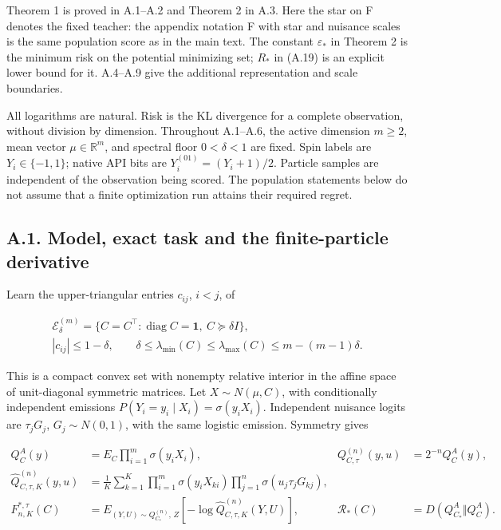 \documentclass{article}
\begin{document}
Theorem 1 is proved in A.1--A.2 and Theorem 2 in A.3. Here the star on F
denotes the fixed teacher: the appendix notation F with star and
nuisance scales is the same population score as in the main text. The
constant \(\varepsilon_*\) in Theorem 2 is the minimum risk on the
potential minimizing set; \(R_*\) in (A.19) is an explicit lower bound
for it. A.4--A.9 give the additional representation and scale
boundaries.

All logarithms are natural. Risk is the KL divergence for a complete
observation, without division by dimension. Throughout A.1--A.6, the
active dimension \(m\ge2\), mean vector \(\mu\in\mathbb R^m\), and
spectral floor \(0<\delta<1\) are fixed. Spin labels are
\(Y_i\in\{-1,1\}\); native API bits are \(Y_i^{(01)}=(Y_i+1)/2\).
Particle samples are independent of the observation being scored. The
population statements below do not assume that a finite optimization run
attains their required regret.

\subsection*{A.1. Model, exact task and the finite-particle
derivative}\label{a.1.-model-exact-task-and-the-finite-particle-derivative}

Learn the upper-triangular entries \(c_{ij}\), \(i<j\), of

\[
\begin{gathered}
\mathcal E_\delta^{(m)}
=\{C=C^\top:\operatorname{diag}C=\mathbf1,\ C\succeq\delta I\},\\
|c_{ij}|\le1-\delta,\qquad
\delta\le\lambda_{\min}(C)\le\lambda_{\max}(C)\le m-(m-1)\delta .
\end{gathered}
\tag{A.1}
\]

This is a compact convex set with nonempty relative interior in the
affine space of unit-diagonal symmetric matrices. Let
\(X\sim N(\mu,C)\), with conditionally independent emissions
\(P(Y_i=y_i\mid X_i)=\sigma(y_iX_i)\). Independent nuisance logits are
\(\tau_jG_j\), \(G_j\sim N(0,1)\), with the same logistic emission.
Symmetry gives

\[
\begin{aligned}
Q_C^A(y)&=E_C\prod_{i=1}^m\sigma(y_iX_i),&
Q_{C,\tau}^{(n)}(y,u)&=2^{-n}Q_C^A(y),\\
\widehat Q_{C,\tau,K}^{(n)}(y,u)
&=\frac1K\sum_{k=1}^K
\prod_{i=1}^m\sigma(y_iX_{ki})\prod_{j=1}^n\sigma(u_j\tau_jG_{kj}),\\
F_{n,K}^{*,\tau}(C)&=E_{(Y,U)\sim Q_{C_*}^{(n)},\,Z}
[-\log\widehat Q_{C,\tau,K}^{(n)}(Y,U)],&
\mathcal R_*(C)&=D(Q_{C_*}^A\Vert Q_C^A).
\end{aligned}
\tag{A.2}
\]
\end{document}
